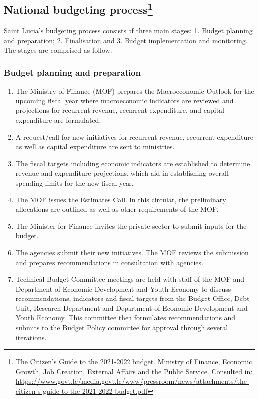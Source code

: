 \documentclass[
  10pt,
]{book}
\begin{document}
\hypertarget{national-budgeting-process}{%
\subsection[National budgeting process]{\texorpdfstring{National budgeting process\footnote{The Citizen's Guide to the 2021-2022 budget. Ministry of Finance, Economic Growth, Job Creation, External Affairs and the Public Service. Consulted in: \url{https://www.govt.lc/media.govt.lc/www/pressroom/news/attachments/the-citizen-s-guide-to-the-2021-2022-budget.pdf}}}{National budgeting process}}\label{national-budgeting-process}}

Saint Lucia's budgeting process consists of three main stages: 1. Budget planning and preparation; 2. Finalisation and 3. Budget implementation and monitoring. The stages are comprised as follow.

\hypertarget{budget-planning-and-preparation}{%
\subsubsection{Budget planning and preparation}\label{budget-planning-and-preparation}}

\begin{enumerate}
\def\labelenumi{\arabic{enumi}.}
\item
  The Ministry of Finance (MOF) prepares the Macroeconomic Outlook for the upcoming fiscal year where macroeconomic indicators are reviewed and projections for recurrent revenue, recurrent expenditure, and capital expenditure are formulated.
\item
  A request/call for new initiatives for recurrent revenue, recurrent expenditure as well as capital expenditure are sent to ministries.
\item
  The fiscal targets including economic indicators are established to determine revenue and expenditure projections, which aid in establishing overall spending limits for the new fiscal year.
\item
  The MOF issues the Estimates Call. In this circular, the preliminary allocations are outlined as well as other requirements of the MOF.
\item
  The Minister for Finance invites the private sector to submit inputs for the budget.
\item
  The agencies submit their new initiatives. The MOF reviews the submission and prepares recommendations in consultation with agencies.
\item
  Technical Budget Committee meetings are held with staff of the MOF and Department of Economic Development and Youth Economy to discuss recommendations, indicators and fiscal targets from the Budget Office, Debt Unit, Research Department and Department of Economic Development and Youth Economy. This committee then formulates recommendations and submits to the Budget Policy committee for approval through several iterations.
\end{enumerate}
\end{document}
